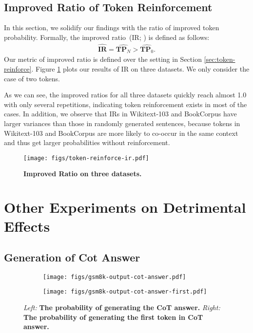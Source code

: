 \subsection{Improved Ratio of Token Reinforcement}
In this section, we solidify our findings with the ratio of improved token probability. Formally, the improved ratio~(IR; \citet{xu2022learning}) is defined as follows: 
\begin{gather}
    \hat{\mathbf{IR}} = \hat{\mathbf{TP}_N} > \hat{\mathbf{TP}_0}.
\end{gather}
Our metric of improved ratio is defined over the setting in Section \ref{sec:token-reinforce}. Figure \ref{fig:ir} plots our results of IR on three datasets. We only consider the case of two tokens. 

As we can see, the improved ratios for all three datasets quickly reach almost 1.0 with only several repetitions, indicating token reinforcement exists in most of the cases. In addition, we observe that IRs in Wikitext-103 and BookCorpus have larger variances than those in randomly generated sentences, because tokens in Wikitext-103 and BookCorpus are more likely to co-occur in the same context and thus get larger probabilities without reinforcement. 

\begin{figure}[t!]
    \centering
    \texttt{[image: figs/token-reinforce-ir.pdf]}
  \caption{\textbf{Improved Ratio on three datasets.} }
  \label{fig:ir}
\end{figure}


\section{Other Experiments on Detrimental Effects}
\subsection{Generation of Cot Answer}
\label{sec:cot_answer}


\begin{figure}[t]
  \centering
  \begin{subfigure}[b]{0.48\linewidth}
    \texttt{[image: figs/gsm8k-output-cot-answer.pdf]}
  \end{subfigure}
  \hfill
  \begin{subfigure}[b]{0.48\linewidth}
    \texttt{[image: figs/gsm8k-output-cot-answer-first.pdf]}
  \end{subfigure}
  \caption{\emph{Left:} \textbf{The probability of generating the CoT answer.} \emph{Right: }\textbf{The probability of generating the first token in CoT answer.}}
  \label{fig:cot_answer}
\end{figure}

